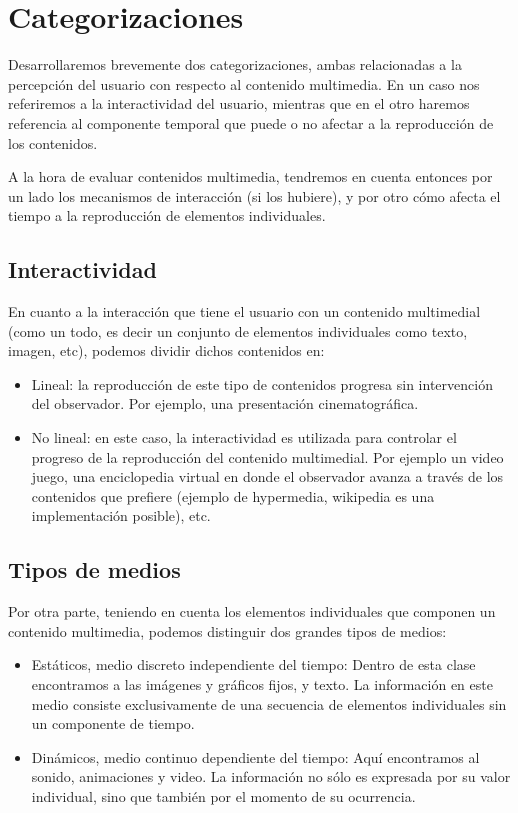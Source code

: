 \documentclass[12pt]{article}
\begin{document}
\section*{Categorizaciones}

Desarrollaremos brevemente dos categorizaciones, ambas relacionadas a la 
percepción del usuario con respecto al contenido multimedia. En un caso 
nos referiremos a la interactividad del usuario, mientras que en el otro 
haremos referencia al componente temporal que puede o no afectar a la
reproducción de los contenidos. 

A la hora de evaluar contenidos multimedia, tendremos en cuenta entonces
por un lado los mecanismos de interacción (si los hubiere), y por otro 
cómo afecta el tiempo a la reproducción de elementos individuales. 

\subsection*{Interactividad}
En cuanto a la interacción que tiene el usuario con un contenido 
multimedial (como un todo, es decir un conjunto de elementos individuales
como texto, imagen, etc), podemos dividir dichos contenidos en: 
\begin{itemize}
\item Lineal: la reproducción de este tipo de contenidos progresa 
sin intervención del observador. Por ejemplo, una presentación cinematográfica.  
\item No lineal: en este caso, la interactividad es utilizada para 
controlar el progreso de la reproducción del contenido multimedial. Por 
ejemplo un video juego, una enciclopedia virtual en donde el observador
avanza a través de los contenidos que prefiere (ejemplo de hypermedia, 
wikipedia es una implementación posible), etc. 
\end{itemize}

\subsection*{Tipos de medios}
Por otra parte, teniendo en cuenta los elementos individuales que componen un 
contenido multimedia, podemos distinguir dos grandes tipos de medios: 

\begin{itemize}
\item{Estáticos, medio discreto independiente del tiempo}: 
Dentro de esta clase encontramos a las imágenes y gráficos fijos, y texto. La información 
en este medio consiste exclusivamente de una secuencia de elementos individuales 
sin un componente de tiempo.
\item{Dinámicos, medio continuo dependiente del tiempo}: 
Aquí encontramos al sonido, animaciones y video. La información no sólo es 
expresada por su valor individual, sino que también por el momento 
de su ocurrencia.
\end{itemize}
\end{document}
